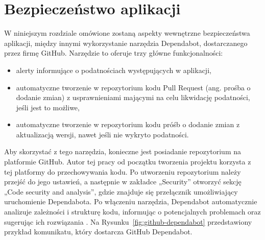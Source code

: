 \documentclass[12pt,twoside]{book}
\begin{document}
\section{Bezpieczeństwo aplikacji}
W niniejszym rozdziale omówione zostaną aspekty wewnętrzne bezpieczeństwa aplikacji, między innymi wykorzystanie narzędzia Dependabot, dostarczanego przez firmę GitHub. Narzędzie to oferuje trzy główne funkcjonalności:

\begin{itemize}
\item alerty informujące o podatnościach występujących w aplikacji,
\item automatyczne tworzenie w repozytorium kodu Pull Request (ang. prośba o dodanie zmian) z usprawnieniami mającymi na celu likwidację podatności, jeśli jest to możliwe,
\item automatyczne tworzenie w repozytorium kodu próśb o dodanie zmian z aktualizacją wersji, nawet jeśli nie wykryto podatności.
\end{itemize}

Aby skorzystać z tego narzędzia, konieczne jest posiadanie repozytorium na platformie GitHub. Autor tej pracy od początku tworzenia projektu korzysta z tej platformy do przechowywania kodu. Po utworzeniu repozytorium należy przejść do jego ustawień, a następnie w zakładce „Security” otworzyć sekcję „Code security and analysis”, gdzie znajduje się przełącznik umożliwiający uruchomienie Dependabota. Po włączeniu narzędzia, Dependabot automatycznie analizuje zależności i strukturę kodu, informując o potencjalnych problemach oraz sugerując ich rozwiązania \cite{github.dependabot}. Na Rysunku~\ref{fig:github-dependabot} przedstawiony przykład komunikatu, który dostarcza GitHub Dependabot.
\end{document}
